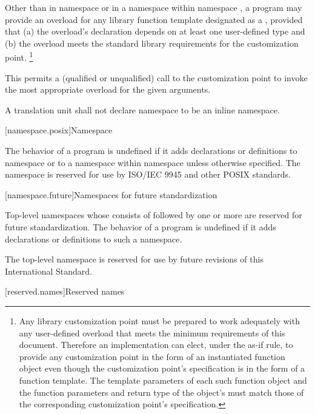 \pnum
Other than in namespace 
or in a namespace
within namespace ,
a program may provide
an overload for any library function template
designated as a ,
provided that
(a)
the overload's declaration depends
on at least one user-defined type
and
(b)
the overload meets the standard library requirements
for the customization point.%
\footnote{
Any library customization point
must be prepared
to work adequately
with any user-defined overload
that meets the minimum requirements
of this document.
Therefore
an implementation can elect,
under the as-if rule,
to provide any customization point
in the form
of an instantiated function object
even though the customization point's specification
is in the form
of a function template.
The template parameters
of each such function object
and the function parameters
and return type
of the object's 
must match those
of the corresponding customization point's specification.}
\begin{note}
This permits
a (qualified or unqualified) call
to the customization point
to invoke the most appropriate overload
for the given arguments.
\end{note}

\pnum
A translation unit shall not declare namespace  to be an inline namespace.

[namespace.posix]{Namespace }

\pnum
The behavior of a \Cpp{} program is undefined if it adds declarations or definitions to namespace
or to a namespace within namespace
unless otherwise specified. The namespace  is reserved for use by
ISO/IEC 9945 and other POSIX standards.

[namespace.future]{Namespaces for future standardization}

\pnum
Top-level namespaces whose  consists of 
followed by one or more 
are reserved for future standardization.
The behavior of a \Cpp{} program is undefined if
it adds declarations or definitions to such a namespace.
\begin{example}
The top-level namespace  is reserved
for use by future revisions of this International Standard.
\end{example}

[reserved.names]{Reserved names}%

